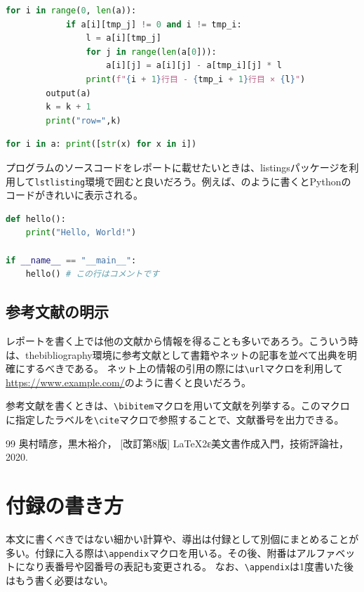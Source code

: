 \documentclass[lualatex,paper=a4paper]{jlreq}
\begin{document}
\begin{lstlisting}[language=Python, caption= {4.k行目以外の行からk行目を何倍かして引き、nと同じ列のn以外の数を0にする。},label=code-sample]
        for i in range(0, len(a)):
            if a[i][tmp_j] != 0 and i != tmp_i:
                l = a[i][tmp_j]
                for j in range(len(a[0])):
                    a[i][j] = a[i][j] - a[tmp_i][j] * l
                print(f"{i + 1}行目 - {tmp_i + 1}行目 × {l}")
        output(a)
        k = k + 1
        print("row=",k)
\end{lstlisting}

\begin{lstlisting}[language=Python, caption= {見た目の処理},label=code-sample]
    for i in a: print([str(x) for x in i])
\end{lstlisting}




プログラムのソースコードをレポートに載せたいときは、listingsパッケージを利用して\verb|lstlisting|環境で囲むと良いだろう。例えば、のように書くとPythonのコードがきれいに表示される。

\begin{lstlisting}[language=Python,caption={便利なおまじない},label=code-sample]
def hello():
    print("Hello, World!")

if __name__ == "__main__":
    hello() # この行はコメントです
\end{lstlisting}

\subsection{参考文献の明示}

レポートを書く上では他の文献から情報を得ることも多いであろう。こういう時は、thebibliography環境に参考文献として書籍やネットの記事を並べて出典を明確にするべきである。
ネット上の情報の引用の際には\verb|\url|マクロを利用して\url{https://www.example.com/}のように書くと良いだろう\cite{texbook}。

参考文献を書くときは、\verb|\bibitem|マクロを用いて文献を列挙する。このマクロに指定したラベルを\verb|\cite|マクロで参照することで、文献番号を出力できる。

\begin{thebibliography}{99}
     奥村晴彦，黒木裕介， [改訂第8版] LaTeX2ε美文書作成入門，技術評論社，2020.
\end{thebibliography}

\appendix

\section{付録の書き方}

本文に書くべきではない細かい計算や、導出は付録として別個にまとめることが多い。付録に入る際は\verb|\appendix|マクロを用いる。その後、附番はアルファベットになり表番号や図番号の表記も変更される。
なお、\verb|\appendix|は1度書いた後はもう書く必要はない。

\end{document}
